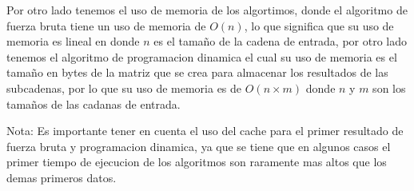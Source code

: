 Por otro lado tenemos el uso de memoria de los algortimos, donde el algoritmo de fuerza bruta tiene un uso de memoria de $O(n)$, lo que significa que
su uso de memoria es lineal en donde $n$ es el tamaño de la cadena de entrada, por otro lado tenemos el algoritmo de programacion dinamica
el cual su uso de memoria es el tamaño en bytes de la matriz que se crea para almacenar los resultados de las subcadenas, por lo que su uso de memoria
es de $O(n \times m)$ donde $n$ y $m$ son los tamaños de las cadanas de entrada.


Nota: Es importante tener en cuenta el uso del cache para el primer resultado de fuerza bruta y programacion dinamica, ya que
se tiene que en algunos casos el primer tiempo de ejecucion de los algoritmos son raramente mas altos que los demas primeros datos.